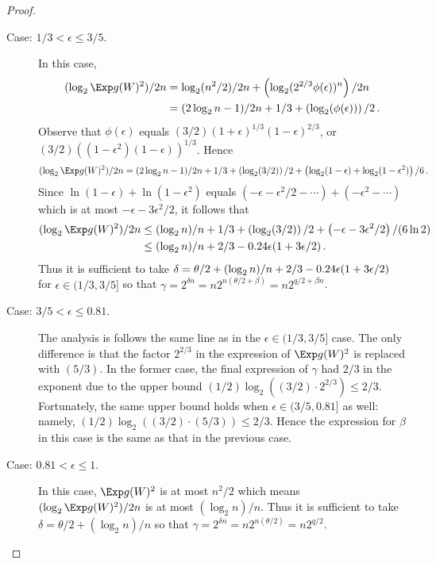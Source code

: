 \begin{proof}
\begin{description}
    \item[Case: $1/3 < \epsilon \leq 3/5$.]
    In this case,
    \begin{align*}
        (\log_2 \Exp g(W)^2)/2n
        &= \log_2(n^2/2)/2n + \left(\log_2( 2^{2/3} \phi(\epsilon) )^n\right)/2n \\
        &= (2\log_2 n - 1)/2n + 1/3 + \left(\log_2( \phi(\epsilon) )\right)/2
        \,.
    \end{align*}
    Observe that $\phi(\epsilon)$ equals $(3/2)(1+\epsilon)^{1/3}(1 - \epsilon)^{2/3}$, 
    or $(3/2)\left( (1-\epsilon^2)(1-\epsilon) \right)^{1/3}$. 
    Hence 
    \begin{align*}
        (\log_2 \Exp g(W)^2)/2n
        &= (2\log_2 n - 1)/2n + 1/3 + 
        \left(\log_2(3/2)\right)/2 + 
        \left(\log_2(1 - \epsilon) + \log_2(1 - \epsilon^2) \right)/6
        \,.
    \end{align*}
    Since $\ln(1 - \epsilon) + \ln(1 - \epsilon^2)$ equals 
    $(-\epsilon - \epsilon^2/2 - \cdots) + (-\epsilon^2 -\cdots)$ which is at most 
    $-\epsilon - 3\epsilon^2/2$, it follows that
    \begin{align*}
        (\log_2 \Exp g(W)^2)/2n
        &\leq (\log_2 n)/n + 1/3 + \left(\log_2(3/2)\right)/2 + 
        \left(-\epsilon - 3\epsilon^2/2 \right)/(6\ln 2) \\
        &\leq (\log_2 n)/n + 2/3 -  0.24 \epsilon (1 + 3\epsilon/2)
        \,.
    \end{align*}
    Thus it is sufficient to take 
    $
        \delta = \theta/2 + (\log_2 n)/n  + 2/3 - 0.24 \epsilon (1 + 3\epsilon/2) \\
    $
    for $\epsilon \in (1/3, 3/5]$ 
    so that $\gamma = 2^{\delta n} = n 2^{n(\theta/2 + \beta)} = n 2^{q/2 + \beta n}$.

    \item[Case: $3/5 < \epsilon \leq 0.81$.] 
    The analysis is follows the same line as in the $\epsilon \in (1/3, 3/5]$ case. 
    The only difference is that the factor $2^{2/3}$ in the expression of $\Exp g(W)^2$ 
    is replaced with $(5/3)$. 
    In the former case, the final expression of $\gamma$ had $2/3$ in the exponent 
    due to the upper bound 
    $(1/2) \log_2\left( (3/2) \cdot 2^{2/3} \right) \leq 2/3$. 
    Fortunately, the same upper bound holds when $\epsilon \in (3/5, 0.81]$ as well: namely, 
    $(1/2) \log_2\left( (3/2) \cdot (5/3) \right) \leq 2/3$. 
    Hence the expression for $\beta$ in this case is the same as that in the previous case.

    \item[Case: $0.81 < \epsilon \leq 1$.]
    In this case, $\Exp g(W)^2$ is at most $n^2/2$ which means 
    $(\log_2 \Exp g(W)^2)/2n$ is at most $(\log_2 n)/n$.
    Thus it is sufficient to take 
    $
        \delta = \theta/2 + (\log_2 n)/n
    $
    so that $\gamma = 2^{\delta n} = n 2^{n(\theta/2)} = n 2^{q/2}$.

  \end{description}

\end{proof}





